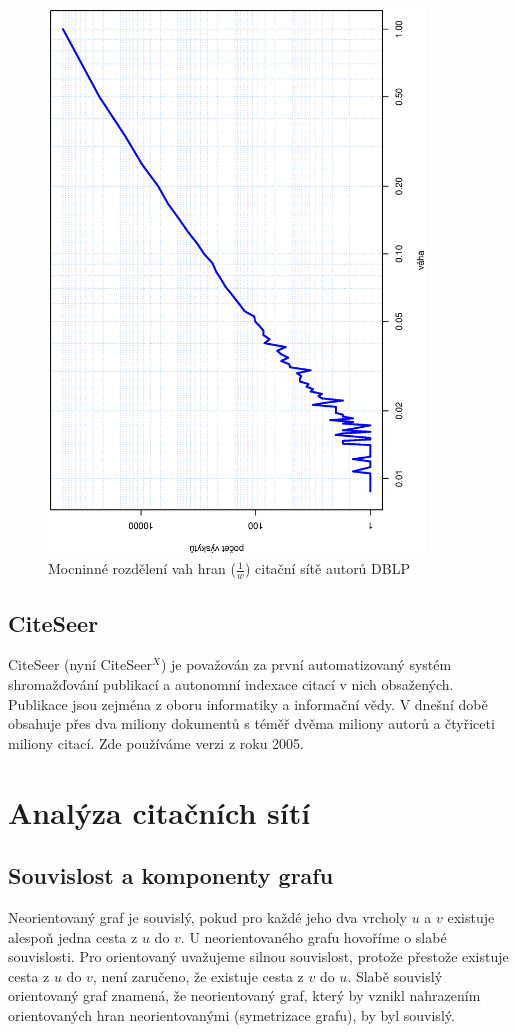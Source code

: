 \documentclass[12pt,titlepage]{report}
\begin{document}
\begin{figure}[!ht]
\centering
	\includegraphics[width=10cm,angle=270]{ewd.eps}
	\caption{Mocninné rozdělení vah hran ($\frac{1}{w}$) citační sítě autorů DBLP}
\end{figure}


\subsection{CiteSeer}
CiteSeer (nyní CiteSeer$^X$) \cite{citeseer} je považován za první
automatizovaný systém shromažďování publikací a autonomní indexace citací v
nich obsažených. Publikace jsou zejména z oboru informatiky a informační vědy.
V dnešní době obsahuje přes dva miliony dokumentů s téměř dvěma miliony autorů
a čtyřiceti miliony citací. Zde používáme verzi z roku 2005.





\section{Analýza citačních sítí}
\subsection{Souvislost a komponenty grafu}
Neorientovaný graf je souvislý, pokud pro každé jeho dva vrcholy $u$ a $v$
existuje alespoň jedna cesta z $u$ do $v$. U neorientovaného grafu hovoříme o
slabé souvislosti. Pro orientovaný uvažujeme silnou souvislost, protože
přestože existuje cesta z $u$ do $v$, není zaručeno, že existuje cesta z $v$ do
$u$.  Slabě souvislý orientovaný graf znamená, že neorientovaný graf, který by
vznikl nahrazením orientovaných hran neorientovanými (symetrizace grafu), by
byl souvislý.
\end{document}
